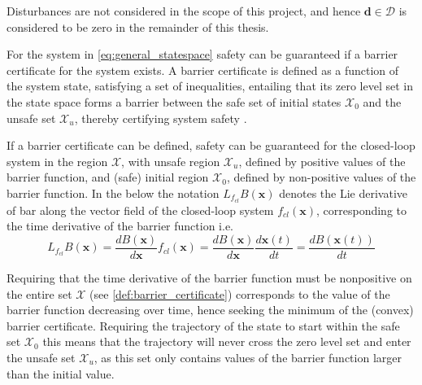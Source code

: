 Disturbances are not considered in the scope of this project, and hence $\mathbf{d}\in \mathcal{D}$ is considered to be zero in the remainder of this thesis.

For the system in \autoref{eq:general_statespace} safety can be guaranteed if a barrier certificate for the system exists. A barrier certificate is defined as a function of the system state, satisfying a set of inequalities, entailing that its zero level set in the state space forms a barrier between the safe set of initial states $\mathcal{X}_0$ and the unsafe set $\mathcal{X}_u$, thereby certifying system safety \citep{bib:prajna_framework}.


If a barrier certificate can be defined, safety can be guaranteed for the closed-loop system in the region $\mathcal{X}$, with unsafe region $\mathcal{X}_u$, defined by positive values of the barrier function, and (safe) initial region $\mathcal{X}_0$, defined by non-positive values of the barrier function. In the below the notation $L_{f_{cl}}B(\mathbf{x})$ denotes the Lie derivative of \gls{bar} along the vector field of the closed-loop system $f_{cl}(\mathbf{x})$, corresponding to the time derivative of the barrier function i.e.
\begin{equation}
L_{f_{cl}}B(\mathbf{x})=\frac{dB(\mathbf{x})}{d\mathbf{x}}f_{cl}(\mathbf{x})=\frac{dB(\mathbf{x})}{d\mathbf{x}}\frac{d\mathbf{x}(t)}{dt}=\frac{dB(\mathbf{x}(t))}{dt}
\end{equation}

Requiring that the time derivative of the barrier function must be nonpositive on the entire set $\mathcal{X}$ (see \autoref{def:barrier_certificate}) corresponds to the value of the barrier function decreasing over time, hence seeking the minimum of the (convex) barrier certificate. Requiring the trajectory of the state to start within the safe set $\mathcal{X}_0$ this means that the trajectory will never cross the zero level set and enter the unsafe set $\mathcal{X}_u$, as this set only contains values of the barrier function larger than the initial value.

